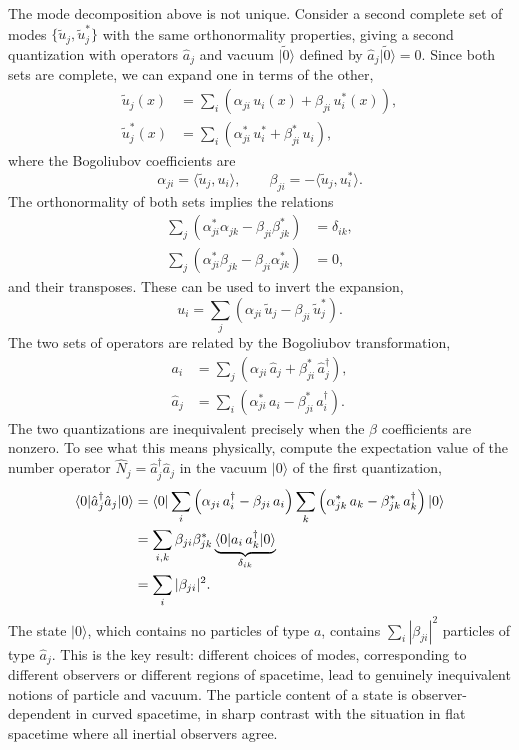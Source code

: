 The mode decomposition above is not unique. Consider a second complete
set of modes $\{\tilde u_j, \tilde u_j^*\}$ with the same
orthonormality properties, giving a second quantization with operators
$\hat a_j$ and vacuum $|\tilde 0\rangle$ defined by
$\hat a_j|\tilde 0\rangle = 0$. Since both sets are complete, we can
expand one in terms of the other,
\begin{align}
	\tilde u_j(x)   & = \sum_i
	\left(\alpha_{ji}\,u_i(x) + \beta_{ji}\,u_i^*(x)\right), \\
	\tilde u_j^*(x) & = \sum_i
	\left(\alpha_{ji}^*\,u_i^* + \beta_{ji}^*\,u_i\right),
\end{align}
where the Bogoliubov coefficients are
\begin{equation}
	\alpha_{ji} = \langle\tilde u_j, u_i\rangle, \qquad
	\beta_{ji} = -\langle\tilde u_j, u_i^*\rangle.
\end{equation}
The orthonormality of both sets implies the relations
\begin{align}
	\sum_j\left(\alpha_{ji}^*\alpha_{jk} - \beta_{ji}\beta_{jk}^*\right)
	 & = \delta_{ik}, \\
	\sum_j\left(\alpha_{ji}^*\beta_{jk} - \beta_{ji}\alpha_{jk}^*\right)
	 & = 0,
\end{align}
and their transposes. These can be used to invert the expansion,
\begin{equation}
	u_i = \sum_j\left(\alpha_{ji}\,\tilde u_j
	- \beta_{ji}\,\tilde u_j^*\right).
\end{equation}
The two sets of operators are related by the Bogoliubov transformation,
\begin{align}
	a_i      & = \sum_j\left(\alpha_{ji}\,\hat a_j
	+ \beta_{ji}^*\,\hat a_j^\dagger\right),       \\
	\hat a_j & = \sum_i\left(\alpha_{ji}^*\,a_i
	- \beta_{ji}^*\,a_i^\dagger\right).
\end{align}
The two quantizations are inequivalent precisely when the $\beta$
coefficients are nonzero. To see what this means physically, compute
the expectation value of the number operator $\hat N_j
	= \hat a_j^\dagger\hat a_j$ in the vacuum $|0\rangle$ of the first
quantization,
\begin{align}
	\langle 0|\hat a_j^\dagger\hat a_j|0\rangle
	 & = \langle 0|\sum_i\left(\alpha_{ji}\,a_i^\dagger
	- \beta_{ji}\,a_i\right)
	\sum_k\left(\alpha_{jk}^*\,a_k
	- \beta_{jk}^*\,a_k^\dagger\right)|0\rangle \notag  \\
	 & = \sum_{i,k}\beta_{ji}\beta_{jk}^*
	\underbrace{\langle 0|a_i\,a_k^\dagger|0\rangle}_{\delta_{ik}}
	\notag                                              \\
	 & = \sum_i|\beta_{ji}|^2.
\end{align}
The state $|0\rangle$, which contains no particles of type $a$,
contains $\sum_i|\beta_{ji}|^2$ particles of type $\hat a_j$. This is
the key result: different choices of modes, corresponding to different
observers or different regions of spacetime, lead to genuinely
inequivalent notions of particle and vacuum. The particle content of a
state is observer-dependent in curved spacetime, in sharp contrast with
the situation in flat spacetime where all inertial observers agree.

